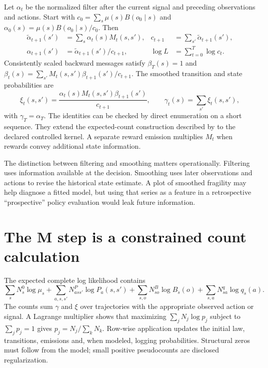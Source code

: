 Let $\alpha_t$ be the normalized filter after the current signal and
preceding observations and actions. Start with
$c_0=\sum_s\mu(s)B(o_0\mid s)$ and
$\alpha_0(s)=\mu(s)B(o_0\mid s)/c_0$. Then
\begin{align}
 \widetilde\alpha_{t+1}(s')&=\sum_s\alpha_t(s)M_t(s,s'),&
 c_{t+1}&=\sum_{s'}\widetilde\alpha_{t+1}(s'),\\
 \alpha_{t+1}(s')&=\widetilde\alpha_{t+1}(s')/c_{t+1},&
 \log L&=\sum_{t=0}^{T}\log c_t.
 \label{eq:scaled-forward}
\end{align}
Consistently scaled backward messages satisfy $\beta_T(s)=1$ and
$\beta_t(s)=\sum_{s'}M_t(s,s')\beta_{t+1}(s')/c_{t+1}$.
The smoothed transition and state probabilities are
\begin{equation}
 \xi_t(s,s')=
 \frac{\alpha_t(s)M_t(s,s')\beta_{t+1}(s')}{c_{t+1}},
 \qquad \gamma_t(s)=\sum_{s'}\xi_t(s,s'),
 \label{eq:controlled-smoothing}
\end{equation}
with $\gamma_T=\alpha_T$. The identities can be checked by direct
enumeration on a short sequence. They extend the expected-count
construction described by \citet[pp.264--266]{rabiner1989} to the
declared controlled kernel. A separate reward emission multiplies $M_t$
when rewards convey additional state information.

The distinction between filtering and smoothing matters operationally.
Filtering uses information available at the decision. Smoothing uses later
observations and actions to revise the historical state estimate. A plot
of smoothed fragility may help diagnose a fitted model, but using that
series as a feature in a retrospective ``prospective'' policy evaluation
would leak future information.

\section{The M step is a constrained count calculation}
The expected complete log likelihood contains
\[
 \sum_s N_s^0\log\mu_s+
 \sum_{a,s,s'}N^P_{ass'}\log P_a(s,s')+
 \sum_{s,o}N^B_{so}\log B_s(o)+
 \sum_{s,a}N^q_{sa}\log q_s(a).
\]
The counts sum $\gamma$ and $\xi$ over trajectories with the
appropriate observed action or signal. A Lagrange multiplier shows that
maximizing $\sum_jN_j\log p_j$ subject to $\sum_jp_j=1$ gives
$p_j=N_j/\sum_kN_k$. Row-wise application updates the initial law,
transitions, emissions and, when modeled, logging probabilities.
Structural zeros must follow from the model; small positive pseudocounts
are disclosed regularization.

